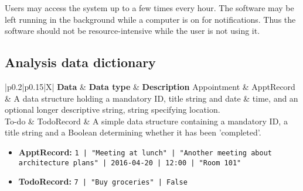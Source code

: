 Users may access the system up to a few times every hour. The software may be
left running in the background while a computer is on for notifications. Thus
the software should not be resource-intensive while the user is not using it.


\subsection{Analysis data dictionary}

\newcommand{\dictline}[1]{#1 \\ \hline}
\begin{table}[H]
    \centering
    \begin{tabularx}{\linewidth}{|p{0.2\linewidth}|p{0.15\linewidth}|X|} \hline
        \textbf{Data} & \textbf{Data type} &
        \textbf{Description} \R
        \dictline{Appointment & ApptRecord
          & A data structure holding a mandatory ID, title string and date \& time, and an
          optional longer descriptive string, string specifying location.}
        \dictline{To-do & TodoRecord
          & A simple data structure containing a mandatory ID, a title string
          and a Boolean determining whether it has been 'completed'.}
    \end{tabularx}
    \caption{The analysis data dictionary.}
    \label{tbl:add}
\end{table}


\begin{itemize}
    \item \textbf{ApptRecord:}
    \texttt{1 | "Meeting at lunch" | "Another meeting about architecture plans" |
    2016-04-20 | 12:00 | "Room 101"}

    \item \textbf{TodoRecord:}
    \texttt{7 | "Buy groceries" | False}
\end{itemize}

